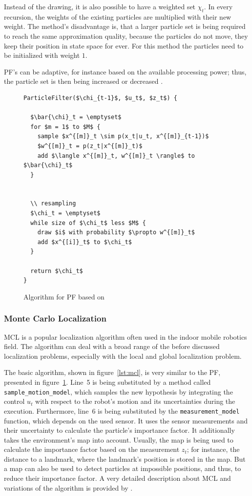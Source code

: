 Instead of the drawing, it is also possible to have a weighted set $\chi_t$. In every recursion, the weights of the existing particles are multiplied with their new weight. The method's disadvantage is, that a larger particle set is being required to reach the same approximation quality, because the particles do not move, they keep their position in state space for ever. For this method the particles need to be initialized with weight $1$.
 
\acs{PF}'s can be adaptive, for instance based on the available processing power; thus, the particle set is then being increased or decreased \citep{thrun:prob_robo}.

\begin{figure}
\begin{lstlisting}[mathescape]
ParticleFilter($\chi_{t-1}$, $u_t$, $z_t$) {

  $\bar{\chi}_t = \emptyset$
  for $m = 1$ to $M$ {
    sample $x^{[m]}_t \sim p(x_t|u_t, x^{[m]}_{t-1})$
    $w^{[m]}_t = p(z_t|x^{[m]}_t)$
    add $\langle x^{[m]}_t, w^{[m]}_t \rangle$ to $\bar{\chi}_t$
  }
  
  
  \\ resampling
  $\chi_t = \emptyset$
  while size of $\chi_t$ less $M$ {
    draw $i$ with probability $\propto w^{[m]}_t$
    add $x^{[i]}_t$ to $\chi_t$
  }
  
  return $\chi_t$
}
\end{lstlisting}
\caption{Algorithm for \acl{PF} based on \citet{thrun:prob_robo}}
\label{lst:pf}
\end{figure}

\subsubsection*{Monte Carlo Localization}\label{sec:fund_mcl}
\ac{MCL} is a popular localization algorithm often used in the indoor mobile robotics field. The algorithm can deal with a broad range of the before discussed localization problems, especially with the local and global localization problem.

The basic algorithm, shown in figure~\ref{lst:mcl}, is very similar to the \acs{PF}, presented in figure~\ref{lst:pf}. Line~5 is being substituted by a method called \texttt{sample\_motion\_model}, which samples the new hypothesis by integrating the control $u_t$ with respect to the robot's motion and its uncertainties during the execution. Furthermore, line~6 is being substituted by the \texttt{measurement\_model} function, which depends on the used sensor. It uses the sensor measurements and their uncertainty to calculate the particle's importance factor. It additionally takes the environment's map into account. Usually, the map is being used to calculate the importance factor based on the measurement $z_t$; for instance, the distance to a landmark, where the landmark's position is stored in the map. But a map can also be used to detect particles at impossible positions, and thus, to reduce their importance factor. A very detailed description about \acl{MCL} and variations of the algorithm is provided by \citet{thrun:prob_robo}.


